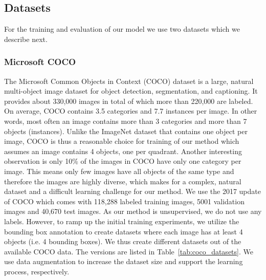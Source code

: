 \documentclass[12pt,a4paper]{article}
\begin{document}
\subsection{Datasets}
For the training and evaluation of our model we use two datasets which we describe next.

\subsubsection{Microsoft COCO}
The Microsoft Common Objects in Context (COCO) dataset \cite{MsCoco} is a large, natural multi-object image dataset for object detection, segmentation, and captioning. It provides about 330,000 images in total of which more than 220,000 are labeled. On average, COCO contains 3.5 categories and 7.7 instances per image. In other words, most often an image contains more than 3 categories and more than 7 objects (instances). Unlike the ImageNet dataset that contains one object per image, COCO is thus a reasonable choice for training of our method which assumes an image contains 4 objects, one per quadrant. Another interesting observation is only 10\% of the images in COCO have only one category per image. This means only few images have all objects of the same type and therefore the images are highly diverse, which makes for a complex, natural dataset and a difficult learning challenge for our method. We use the 2017 update of COCO which comes with 118,288 labeled training images, 5001 validation images and 40,670 test images. As our method is unsupervised, we do not use any labels. However, to ramp up the initial training experiments, we utilize the bounding box annotation to create datasets where each image has at least 4 objects (i.e. 4 bounding boxes). We thus create different datasets out of the available COCO data. The versions are listed in Table~\ref{tab:coco_datasets}. We use data augmentation to increase the dataset size and support the learning process, respectively.
\end{document}
